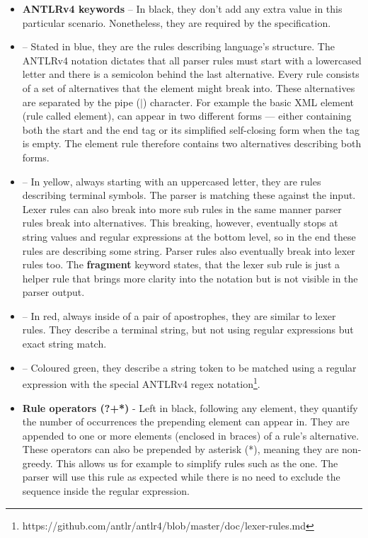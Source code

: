 \begin{itemize}
	\item \textbf{ANTLRv4 keywords} -- In black, they don't add any extra value in this particular scenario.
	Nonetheless, they are required by the specification.

	\item {} -- Stated in blue, they are the rules describing language's structure.
	The ANTLRv4 notation dictates that all parser rules must start with a lowercased letter and there is a semicolon behind the last alternative.
	Every rule consists of a set of alternatives that the element might break into.
	These alternatives are separated by the pipe ($|$) character.
	For example the basic XML element (rule called element), can appear in two different forms --- either containing both the start and the end tag or its simplified self-closing form when the tag is empty.
	The element rule therefore contains two alternatives describing both forms.

	\item {} -- In yellow, always starting with an uppercased letter, they are rules describing terminal symbols.
	The parser is matching these against the input.
	Lexer rules can also break into more sub rules in the same manner parser rules break into alternatives.
	This breaking, however, eventually stops at string values and regular expressions at the bottom level, so in the end these rules are describing some string.
	Parser rules also eventually break into lexer rules too.
	The \textbf{fragment} keyword states, that the lexer sub rule is just a helper rule that brings more clarity into the notation but is not visible in the parser output.

	\item {} -- In red, always inside of a pair of apostrophes, they are similar to lexer rules.
	They describe a terminal string, but not using regular expressions but exact string match.

	\item {} -- Coloured green, they describe a string token to be matched using a regular expression with the special ANTLRv4 regex notation\footnote{https://github.com/antlr/antlr4/blob/master/doc/lexer-rules.md}.

	\item \textbf{Rule operators (?+*)} - Left in black, following any element, they quantify the number of occurrences the prepending element can appear in.
	They are appended to one or more elements (enclosed in braces) of a rule's alternative.
	These operators can also be prepended by asterisk (*), meaning they are non-greedy.
	This allows us for example to simplify rules such as the  one.
	The parser will use this rule as expected while there is no need to exclude the \literal{\texttt{]]>}} sequence inside the regular expression.
\end{itemize}